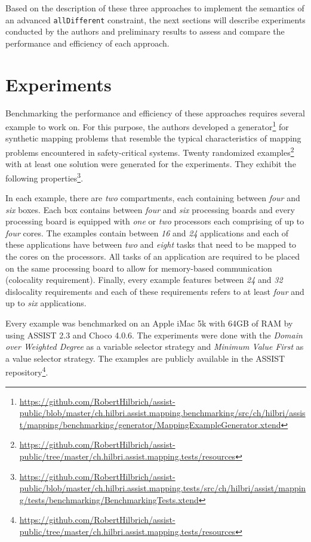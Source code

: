 \documentclass[english,biblatex]{lni}
\begin{document}
Based on the description of these three approaches to implement the semantics of an advanced \texttt{allDifferent} constraint, the next sections will describe experiments conducted by the authors and preliminary results to assess and compare the performance and efficiency of each approach.

\section{Experiments}

Benchmarking the performance and efficiency of these approaches requires several example to work on.
For this purpose, the authors developed a generator\footnote{\url{https://github.com/RobertHilbrich/assist-public/blob/master/ch.hilbri.assist.mapping.benchmarking/src/ch/hilbri/assist/mapping/benchmarking/generator/MappingExampleGenerator.xtend}} for synthetic mapping problems that resemble the typical characteristics of mapping problems encountered in safety-critical systems.
Twenty randomized examples\footnote{\url{https://github.com/RobertHilbrich/assist-public/tree/master/ch.hilbri.assist.mapping.tests/resources}} with at least one solution were generated for the experiments.
They exhibit the following properties\footnote{\url{https://github.com/RobertHilbrich/assist-public/blob/master/ch.hilbri.assist.mapping.tests/src/ch/hilbri/assist/mapping/tests/benchmarking/BenchmarkingTests.xtend}}.

In each example, there are \emph{two} compartments, each containing between \emph{four} and \emph{six} boxes.
Each box contains between \emph{four} and \emph{six} processing boards and every processing board is equipped with \emph{one} or \emph{two} processors each comprising of up to \emph{four} cores.
The examples contain between \emph{16} and \emph{24} applications and each of these applications have between \emph{two} and \emph{eight} tasks that need to be mapped to the cores on the processors.
All tasks of an application are required to be placed on the same processing board to allow for memory-based communication (colocality requirement).
Finally, every example features between \emph{24} and \emph{32} dislocality requirements and each of these requirements refers to at least \emph{four} and up to \emph{six} applications.

Every example was benchmarked on an Apple iMac 5k with 64GB of RAM by using ASSIST 2.3 and Choco 4.0.6.
The experiments were done with the \emph{Domain over Weighted Degree} as a variable selector strategy and \emph{Minimum Value First} as a value selector strategy.
The examples are publicly available in the ASSIST repository\footnote{\url{https://github.com/RobertHilbrich/assist-public/tree/master/ch.hilbri.assist.mapping.tests/resources}}.
\end{document}
